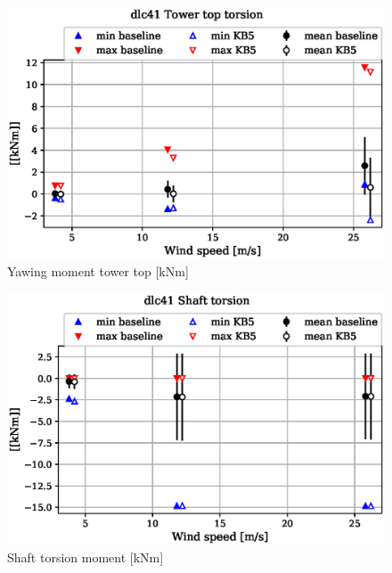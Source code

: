 \begin{figure}[!ht]
\begin{center}
	\includegraphics[width=.85\linewidth]{figures/baseline-vs-KB6/dlc41/tower-tower-node-004-momentvec-z_AA0007_AA0003.eps}
\end{center}
\caption{Yawing moment tower top [kNm]}
\label{fig:baseline-vs-KB6:dlc41:tower-top-yaw}
\end{figure}

\begin{figure}[!ht]
\begin{center}
	\includegraphics[width=.85\linewidth]{figures/baseline-vs-KB6/dlc41/shaft-shaft-node-001-momentvec-z_AA0007_AA0003.eps}
\end{center}
\caption{Shaft torsion moment [kNm]}
\label{fig:baseline-vs-KB6:dlc41:shaft-torsion}
\end{figure}

